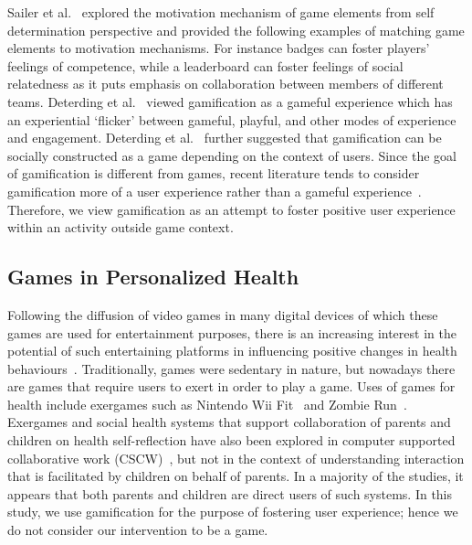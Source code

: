 \documentclass{sig-alternate}
\begin{document}
 Sailer et al.~\cite{sailer2013:psychological} explored the motivation mechanism of game elements from self determination perspective and provided the following examples of matching game elements to motivation mechanisms. For instance badges can foster players' feelings of competence, while a leaderboard can foster feelings of social relatedness as it puts emphasis on collaboration between members of different teams. Deterding et al.~\cite{deterding2011game} viewed gamification as a gameful experience which has an experiential `flicker' between gameful, playful, and other modes of experience and engagement. Deterding et al.~\cite{deterding2011game} further suggested that gamification can be socially constructed as a game depending on the context of users. Since the goal of gamification is different from games, recent literature  tends to consider gamification more of a user experience rather than a gameful experience~\cite{seaborn2015:gamification}. Therefore, we view gamification as an attempt to foster positive user experience within an activity outside game context.

\subsection{Games in Personalized Health}  
Following the diffusion of video games in many digital devices of which these games are used for entertainment purposes, there is an increasing interest in the potential of such entertaining platforms in influencing positive changes in health behaviours~\cite{king2013gamification}. Traditionally, games were sedentary in nature, but nowadays there are games that require users to exert in order to play a game. Uses of games for health include exergames such as Nintendo Wii Fit~\cite{gobel2010serious} and Zombie Run~\cite{witkowski2013running}. Exergames and social health systems that support collaboration of parents and children on health self-reflection have also been explored in computer supported collaborative work (CSCW)~\cite{grimes2009toward,saksono2015spaceship}, but not in the context of understanding interaction that is facilitated by children on behalf of parents. In a majority of the studies, it appears that both parents and children are direct users of such systems. In this study, we use gamification for the purpose of fostering user experience; hence we do not consider our intervention to be a game.
\end{document}
